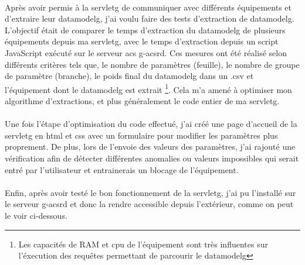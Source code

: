 \documentclass[12pt,a4paper]{report}
\begin{document}
\paragraph*{}Après avoir permis à la \gls{servletg} de communiquer avec différents équipements et d’extraire leur \gls{datamodelg}, j’ai voulu faire des tests d’extraction de \gls{datamodelg}. L’objectif était de comparer le temps d’extraction du \gls{datamodelg} de plusieurs équipements depuis ma \gls{servletg}, avec le temps d’extraction depuis un script JavaScript exécuté sur le serveur \gls{acs} g-acsrd. Ces mesures ont été réalisé selon différents critères tels que, le nombre de paramètres (feuille), le nombre de groupe de paramètre (branche), le poids final du \gls{datamodelg} dans un .csv et l’équipement dont le \gls{datamodelg} est extrait \footnote{Les capacités de RAM et cpu de l'équipement sont très influentes sur l'éxecution des requêtes permettant de parcourir le \gls{datamodelg}}. Cela m’a amené à optimiser mon algorithme d’extractions, et plus généralement le code entier de ma \gls{servletg}.
\paragraph*{}Une fois l’étape d’optimisation du code effectué, j’ai créé une page d’accueil de la \gls{servletg} en html et css avec un formulaire pour modifier les paramètres plus proprement. De plus, lors de l’envoie des valeurs des paramètres, j’ai rajouté une vérification afin de détecter différentes anomalies ou valeurs impossibles qui serait entré par l’utilisateur et entrainerais un blocage de l’équipement.
\paragraph*{}Enfin, après avoir testé le bon fonctionnement de la \gls{servletg}, j’ai pu l’installé sur le serveur g-acsrd et donc la rendre accessible depuis l’extérieur, comme on peut le voir ci-dessous.
\end{document}

